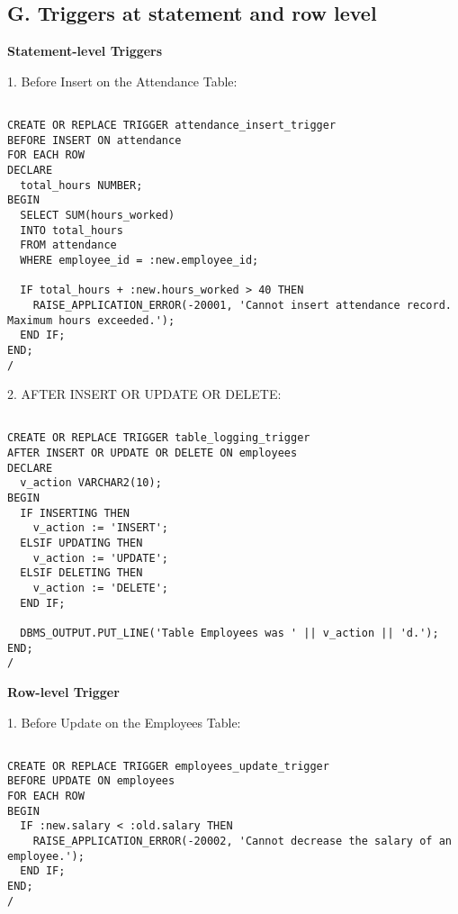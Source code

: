 \documentclass[11pt]{article} %
\begin{document}
\subsection*{G. Triggers at statement and row level }

\textbf{Statement-level Triggers}

1. Before Insert on the Attendance Table:

\begin{small}
\begin{verbatim}

CREATE OR REPLACE TRIGGER attendance_insert_trigger
BEFORE INSERT ON attendance
FOR EACH ROW
DECLARE
  total_hours NUMBER;
BEGIN
  SELECT SUM(hours_worked)
  INTO total_hours
  FROM attendance
  WHERE employee_id = :new.employee_id;
  
  IF total_hours + :new.hours_worked > 40 THEN
    RAISE_APPLICATION_ERROR(-20001, 'Cannot insert attendance record. Maximum hours exceeded.');
  END IF;
END;
/

\end{verbatim}
\end{small}

2. AFTER INSERT OR UPDATE OR DELETE:

\begin{small}
\begin{verbatim}

CREATE OR REPLACE TRIGGER table_logging_trigger
AFTER INSERT OR UPDATE OR DELETE ON employees
DECLARE
  v_action VARCHAR2(10);
BEGIN
  IF INSERTING THEN
    v_action := 'INSERT';
  ELSIF UPDATING THEN
    v_action := 'UPDATE';
  ELSIF DELETING THEN
    v_action := 'DELETE';
  END IF;
  
  DBMS_OUTPUT.PUT_LINE('Table Employees was ' || v_action || 'd.');
END;
/

\end{verbatim}
\end{small}

\pagebreak

\textbf{Row-level Trigger }

1. Before Update on the Employees Table:

\begin{small}
\begin{verbatim}

CREATE OR REPLACE TRIGGER employees_update_trigger
BEFORE UPDATE ON employees
FOR EACH ROW
BEGIN
  IF :new.salary < :old.salary THEN
    RAISE_APPLICATION_ERROR(-20002, 'Cannot decrease the salary of an employee.');
  END IF;
END;
/

\end{verbatim}
\end{small}
\end{document}
